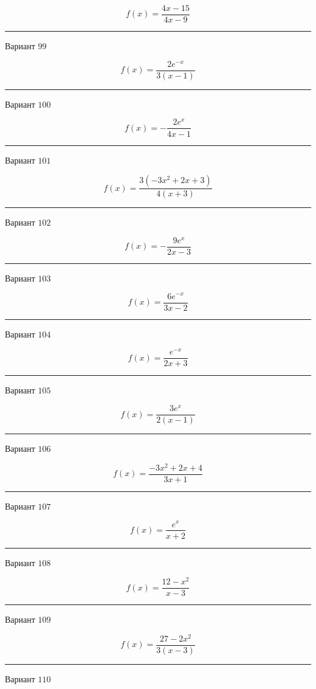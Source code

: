 \documentclass[11pt]{report}
\begin{document}
$$f(x) = \frac{4 x - 15}{4 x - 9}$$
\begin{center}
\noindent\rule{8cm}{0.4pt}
\end{center}
Вариант $99$


$$f(x) = \frac{2 e^{- x}}{3 \left(x - 1\right)}$$
\begin{center}
\noindent\rule{8cm}{0.4pt}
\end{center}
Вариант $100$


$$f(x) = - \frac{2 e^{x}}{4 x - 1}$$
\begin{center}
\noindent\rule{8cm}{0.4pt}
\end{center}
Вариант $101$


$$f(x) = \frac{3 \left(- 3 x^{2} + 2 x + 3\right)}{4 \left(x + 3\right)}$$
\begin{center}
\noindent\rule{8cm}{0.4pt}
\end{center}
Вариант $102$


$$f(x) = - \frac{9 e^{x}}{2 x - 3}$$
\begin{center}
\noindent\rule{8cm}{0.4pt}
\end{center}
Вариант $103$


$$f(x) = \frac{6 e^{- x}}{3 x - 2}$$
\begin{center}
\noindent\rule{8cm}{0.4pt}
\end{center}
Вариант $104$


$$f(x) = \frac{e^{- x}}{2 x + 3}$$
\begin{center}
\noindent\rule{8cm}{0.4pt}
\end{center}
Вариант $105$


$$f(x) = \frac{3 e^{x}}{2 \left(x - 1\right)}$$
\begin{center}
\noindent\rule{8cm}{0.4pt}
\end{center}
Вариант $106$


$$f(x) = \frac{- 3 x^{2} + 2 x + 4}{3 x + 1}$$
\begin{center}
\noindent\rule{8cm}{0.4pt}
\end{center}
Вариант $107$


$$f(x) = \frac{e^{x}}{x + 2}$$
\begin{center}
\noindent\rule{8cm}{0.4pt}
\end{center}
Вариант $108$


$$f(x) = \frac{12 - x^{2}}{x - 3}$$
\begin{center}
\noindent\rule{8cm}{0.4pt}
\end{center}
Вариант $109$


$$f(x) = \frac{27 - 2 x^{2}}{3 \left(x - 3\right)}$$
\begin{center}
\noindent\rule{8cm}{0.4pt}
\end{center}
Вариант $110$
\end{document}

